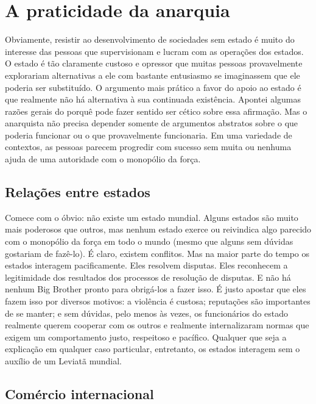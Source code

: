 \section{A praticidade da anarquia}

Obviamente, resistir ao desenvolvimento de sociedades sem estado é muito do interesse das pessoas que supervisionam e lucram com as operações dos estados. O estado é tão claramente custoso e opressor que muitas pessoas provavelmente explorariam alternativas a ele com bastante entusiasmo se imaginassem que ele poderia ser substituído. O argumento mais prático a favor do apoio ao estado é que realmente não há alternativa à sua continuada existência. Apontei algumas razões gerais do porquê pode fazer sentido ser cético sobre essa afirmação. Mas o anarquista não precisa depender somente de argumentos abstratos sobre o que poderia funcionar ou o que provavelmente funcionaria. Em uma variedade de contextos, as pessoas parecem progredir com sucesso sem muita ou nenhuma ajuda de uma autoridade com o monopólio da força.

\subsection*{Relações entre estados}

Comece com o óbvio: não existe um estado mundial. Alguns estados são muito mais poderosos que outros, mas nenhum estado exerce ou reivindica algo parecido com o monopólio da força em todo o mundo (mesmo que alguns sem dúvidas gostariam de fazê-lo). É claro, existem conflitos. Mas na maior parte do tempo os estados interagem pacificamente. Eles resolvem disputas. Eles reconhecem a legitimidade dos resultados dos processos de resolução de disputas. E não há nenhum Big Brother pronto para obrigá-los a fazer isso. É justo apostar que eles fazem isso por diversos motivos: a violência é custosa; reputações são importantes de se manter; e sem dúvidas, pelo menos às vezes, os funcionários do estado realmente querem cooperar com os outros e realmente internalizaram normas que exigem um comportamento justo, respeitoso e pacífico. Qualquer que seja a explicação em qualquer caso particular, entretanto, os estados interagem sem o auxílio de um Leviatã mundial.

\subsection*{Comércio internacional}

